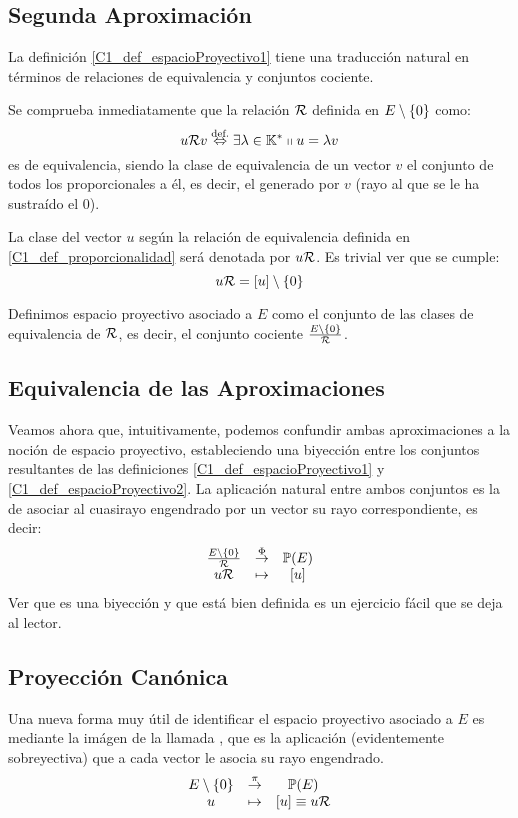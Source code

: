 \subsection{Segunda Aproximación}
\label{C1_S1_segundaAprox}
La definición \ref{C1_def_espacioProyectivo1} tiene una traducción natural en términos de relaciones de equivalencia y conjuntos cociente.
\begin{defi}
	\label{C1_def_proporcionalidad}
	Se comprueba inmediatamente que la relación $\mathcal{R}$ definida en $E\setminus\{0\}$ como:
	\[u\mathcal{R}v\stackrel{\textrm{def.}}{\Leftrightarrow} \exists \lambda\in\mathbb{K}^*\shortparallel u = \lambda v\]
	es de equivalencia, siendo la clase de equivalencia de un vector $v$ el conjunto de todos los proporcionales a él, es decir, el  generado por $v$ (rayo al que se le ha sustraído el $0$).
\end{defi}
La clase del vector $u$ según la relación de equivalencia definida en \ref{C1_def_proporcionalidad} será denotada por $u\mathcal{R}$. Es trivial ver que se cumple:
\[u\mathcal{R}=\left [ u \right ]\setminus\{0\}\]
\begin{defi}
	\label{C1_def_espacioProyectivo2}
	Definimos espacio proyectivo asociado a $E$ como el conjunto de las clases de equivalencia de $\mathcal{R}$, es decir, el conjunto cociente $\frac{E\setminus\{0\}}{\mathcal{R}}$.
\end{defi}
\subsection{Equivalencia de las Aproximaciones}
\label{C1_S1_equivalenciaAprox}
Veamos ahora que, intuitivamente, podemos confundir ambas aproximaciones a la noción de espacio proyectivo, estableciendo una biyección entre los conjuntos resultantes de las definiciones \ref{C1_def_espacioProyectivo1} y \ref{C1_def_espacioProyectivo2}. La aplicación natural entre ambos conjuntos es la de asociar al cuasirayo engendrado por un vector su rayo correspondiente, es decir:
\begin{equation}
\label{C1_eq_indentificacionNociones}
	\begin{array}{ccc}
	\frac{E\setminus\{0\}}{\mathcal{R}} & \stackrel{\Phi}{\to} & \mathbb{P}(E)\\
	u\mathcal{R} & \mapsto & \left [ u \right ]
	\end{array}
\end{equation}
Ver que es una biyección y que está bien definida es un ejercicio fácil que se deja al lector.
\subsection{Proyección Canónica}
\label{C1_S1_proyeccionCanonica}
Una nueva forma muy útil de identificar el espacio proyectivo asociado a $E$ es mediante la imágen de la llamada , que es la aplicación (evidentemente sobreyectiva) que a cada vector le asocia su rayo engendrado.
\begin{equation}
\label{C1_eq_proyeccionCanonica}
	\begin{array}{ccc}
	E\setminus\{0\} & \stackrel{\pi}{\to} & \mathbb{P}(E)\\
	u & \mapsto & \left [ u \right ]\equiv u\mathcal{R}
	\end{array}
\end{equation}

